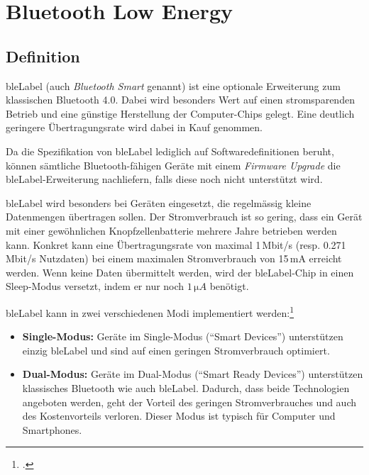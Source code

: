 \chapter{Bluetooth Low Energy}
\label{ch:ble}


\section{Definition}
\gls{bleLabel} (auch \textit{Bluetooth Smart} genannt) ist eine optionale Erweiterung zum klassischen Bluetooth 4.0.
Dabei wird besonders Wert auf einen stromsparenden Betrieb und eine günstige Herstellung der Computer-Chips gelegt. Eine deutlich geringere Übertragungsrate wird dabei in Kauf genommen.

Da die Spezifikation von \gls{bleLabel} lediglich auf Softwaredefinitionen beruht, können sämtliche Bluetooth-fähigen Geräte mit einem \textit{Firmware Upgrade} die \gls{bleLabel}-Erweiterung nachliefern, falls diese noch nicht unterstützt wird.

\gls{bleLabel} wird besonders bei Geräten eingesetzt, die regelmässig kleine Datenmengen übertragen sollen.
Der Stromverbrauch ist so gering, dass ein Gerät mit einer gewöhnlichen Knopfzellenbatterie mehrere Jahre betrieben werden kann. Konkret kann eine Übertragungsrate von maximal 1\,Mbit/s (resp. 0.271\,Mbit/s Nutzdaten) bei einem maximalen Stromverbrauch von 15\,mA erreicht werden.
Wenn keine Daten übermittelt werden, wird der \gls{bleLabel}-Chip in einen Sleep-Modus versetzt, indem er nur noch $1\,\si{\micro A}$ benötigt.

\gls{bleLabel} kann in zwei verschiedenen Modi implementiert werden:\footcite{Bluetooth_Low_Energy_vs_Classic_Bluetooth_Medical_Electronics_Design_2015-04-27}
\begin{itemize}
	\item \textbf{Single-Modus:} Geräte im Single-Modus ("`Smart Devices"') unterstützen einzig \gls{bleLabel} und sind auf einen geringen Stromverbrauch optimiert.
	\item \textbf{Dual-Modus:} Geräte im Dual-Modus ("`Smart Ready Devices"') unterstützen klassisches Bluetooth wie auch \gls{bleLabel}.
	Dadurch, dass beide Technologien angeboten werden, geht der Vorteil des geringen Stromverbrauches und auch des Kostenvorteils verloren. Dieser Modus ist typisch für Computer und Smartphones.
\end{itemize}


